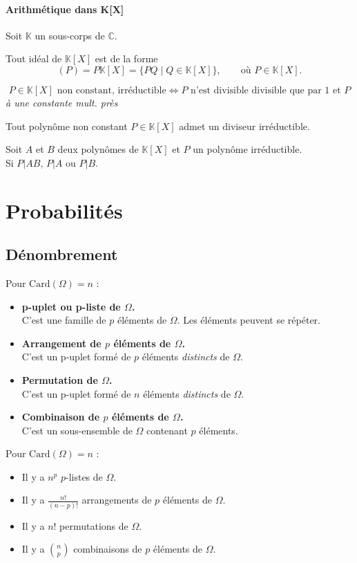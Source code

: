 \documentclass[a4paper,12pt]{report}
\newcommand{\Def}[2]{\begin{tcolorbox}[colback=white,colframe=CornflowerBlue, title=Définition : #1]#2\end{tcolorbox}}
\newcommand{\Thm}[2]{\begin{tcolorbox}[colback=white,colframe=Red!60, title=Théorème : #1]#2\end{tcolorbox}}
\def\C{\mathbb{C}}
\def\K{\mathbb{K}}
\newcommand{\ssi}{\Longleftrightarrow}
\begin{document}
\subsubsection{Arithmétique dans K[X]}
Soit $\K$ un sous-corps de $\C$.

\Thm{Idéaux de l'anneau des polynômes} {
Tout idéal de $\K[X]$ est de la forme
\[
(P)=P\K[X]=\{PQ \mid Q\in \K[X]\},
\qquad \text{où } P\in \K[X].
\]
}

\Def{Polynômes irréductible}{
\[P\in\K[X] \text{ non constant, irréductible} \ssi P \text{ n'est divisible divisible que par 1 et $P$}\]
\textit{à une constante mult. près}
}

\Thm{Existence d'un polynôme irréductible}{
Tout polynôme non constant $P\in\K[X]$ admet un diviseur irréductible.
}

\Thm{D'euclide}{
Soit $A$ et $B$ deux polynômes de $\K[X]$ et $P$ un polynôme irréductible. \\
Si $P|AB$, $P|A$ ou $P|B$.
}

\chapter{Probabilités}
\section{Dénombrement}
\Def{p-uplet arrangement permutation combinaison}{
Pour $\mathrm{Card}(\Omega) = n$ :
\begin{itemize}
    \item \textbf{p-uplet ou p-liste de $\Omega$.}\\
    C’est une famille de $p$ éléments de $\Omega$. Les éléments peuvent se répéter.

    \item \textbf{Arrangement de $p$ éléments de $\Omega$.}\\
    C’est un p-uplet formé de $p$ éléments \emph{distincts} de $\Omega$. 

    \item \textbf{Permutation de $\Omega$.}\\
    C’est un p-uplet formé de $n$ éléments \emph{distincts} de $\Omega$.

    \item \textbf{Combinaison de $p$ éléments de $\Omega$.}\\
    C’est un sous-ensemble de $\Omega$ contenant $p$ éléments.
\end{itemize}
}
\Thm{Nombre de p-uplet arrangement permutation combinaison}{
Pour $\mathrm{Card}(\Omega) = n$ :

\begin{itemize}
    \item Il y a \(n^p\) \(p\)-listes de \(\Omega\).
    \item Il y a \(\displaystyle \frac{n!}{(n-p)!}\) arrangements de \(p\) éléments de \(\Omega\).
    \item Il y a \(n!\) permutations de \(\Omega\).
    \item Il y a \(\displaystyle \binom{n}{p}\) combinaisons de \(p\) éléments de \(\Omega\).
\end{itemize}
}
\end{document}
